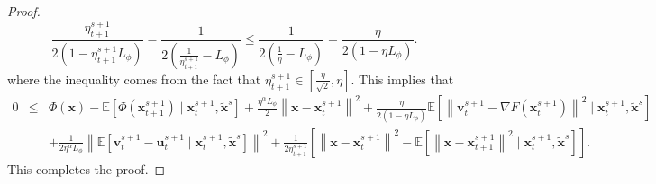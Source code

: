 \documentclass[11pt]{article}
\newcommand{\BE}{\mathbb{E}}
\newcommand{\x}{\mathbf x}
\newcommand{\su}{\mathbf u}
\newcommand{\sv}{\mathbf v}
\begin{document}
\begin{proof}
\begin{equation*}
\frac{\eta_{t+1}^{s+1}}{2(1-\eta_{t+1}^{s+1} L_\phi)} = \frac{1}{2(\frac{1}{\eta_{t+1}^{s+1}}-L_\phi)} \leq \frac{1}{2(\frac{1}{\eta}-L_\phi)} = \frac{\eta}{2(1-\eta L_\phi)}. 
\end{equation*}
where the inequality comes from the fact that $\eta_{t+1}^{s+1} \in \left[\frac{\eta}{\sqrt{2}}, \eta\right]$. This implies that 
\begin{eqnarray*}
0 & \leq & \Phi(\x) - \BE\left[\Phi(\x_{t+1}^{s+1}) \mid \x_t^{s+1}, \tilde{\x}^s \right] + \frac{\eta^\alpha L_\phi}{2}\left\| \x - \x_t^{s+1} \right\|^2 + \frac{\eta}{2(1-\eta L_\phi)}\BE\left[\left\| \sv_t^{s+1} - \nabla F(\x_t^{s+1}) \right\|^2 \mid \x_t^{s+1}, \tilde{\x}^s \right] \\
& & + \frac{1}{2 \eta^\alpha L_\phi} \left\| \BE\left[\sv_t^{s+1} - \su_t^{s+1} \mid \x_t^{s+1}, \tilde{\x}^s \right] \right\|^2 + \frac{1}{2\eta_{t+1}^{s+1}}\left[ \left\| \x - \x_t^{s+1} \right\|^2 - \BE\left[\left\| \x - \x_{t+1}^{s+1} \right\|^2 \mid \x_t^{s+1}, \tilde{\x}^s \right] \right]. 
\end{eqnarray*}
This completes the proof. 
\end{proof}
\end{document}
